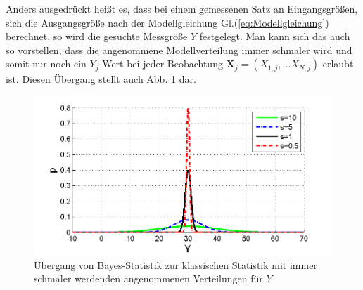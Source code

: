 Anders ausgedrückt heißt es, dass bei einem gemessenen Satz an Eingangsgrößen,
sich die Ausgangsgröße nach der Modellgleichung Gl.(\ref{eq:Modellgleichung}) berechnet,
so wird die gesuchte Messgröße $Y$ festgelegt. Man kann sich das auch so vorstellen, dass
die angenommene Modellverteilung immer schmaler wird und somit nur 
noch ein $Y_j$ Wert bei jeder Beobachtung $\boldsymbol{X}_j = (X_{1,j}, \dots X_{N,j})$ 
erlaubt ist.
Diesen Übergang stellt auch Abb. \ref*{fig:Uebergang_Delta_Funktion} dar. 
\begin{figure}[!htp]
	\begin{center}
		\includegraphics[width=130mm]{10_vorlesung/media/DeltaPeaken.png}
		\caption{Übergang von Bayes-Statistik zur klassischen Statistik mit immer schmaler werdenden angenommenen Verteilungen für $Y$}
		\label{fig:Uebergang_Delta_Funktion}
	\end{center}
\end{figure}

